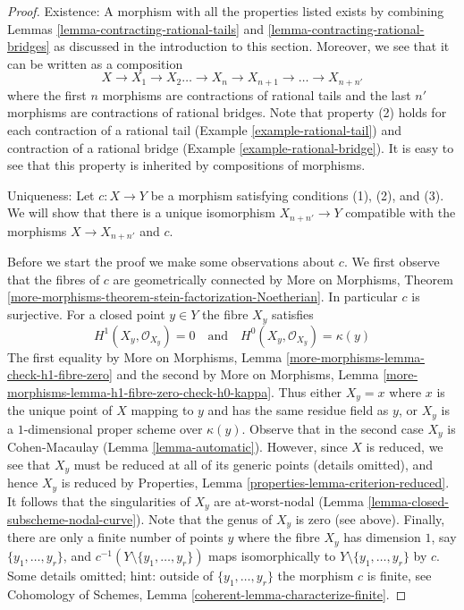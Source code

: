 \documentclass[10pt,a4paper]{amsart}
\theoremstyle{plain}
\theoremstyle{definition}
\theoremstyle{remark}
\numberwithin{equation}{subsection}
\begin{document}
\begin{proof}
Existence: A morphism with all the properties listed exists by
combining Lemmas \ref{lemma-contracting-rational-tails} and
\ref{lemma-contracting-rational-bridges} as discussed in the
introduction to this section.
Moreover, we see that it can be written as a composition
$$
X \to X_1 \to X_2 \ldots \to X_n \to X_{n + 1} \to \ldots \to X_{n + n'}
$$
where the first $n$ morphisms are contractions of rational tails
and the last $n'$ morphisms are contractions of rational bridges.
Note that property (2) holds for each contraction of a rational
tail (Example \ref{example-rational-tail}) and contraction of a
rational bridge (Example \ref{example-rational-bridge}).
It is easy to see that this property is inherited by compositions of morphisms.

\medskip\noindent
Uniqueness: Let $c : X \to Y$ be a morphism satisfying conditions
(1), (2), and (3). We will show that there is a unique isomorphism
$X_{n + n'} \to Y$ compatible with the morphisms $X \to X_{n + n'}$ and $c$.

\medskip\noindent
Before we start the proof we make some observations about $c$.
We first observe that the fibres of $c$ are geometrically connected by
More on Morphisms, Theorem
\ref{more-morphisms-theorem-stein-factorization-Noetherian}.
In particular $c$ is surjective.
For a closed point $y \in Y$ the fibre $X_y$ satisfies
$$
H^1(X_y, \mathcal{O}_{X_y}) = 0
\quad\text{and}\quad
H^0(X_y, \mathcal{O}_{X_y}) = \kappa(y)
$$
The first equality by More on Morphisms, Lemma
\ref{more-morphisms-lemma-check-h1-fibre-zero}
and the second by More on Morphisms, Lemma
\ref{more-morphisms-lemma-h1-fibre-zero-check-h0-kappa}.
Thus either $X_y = x$ where $x$ is the unique point of $X$ mapping to
$y$ and has the same residue field as $y$, or $X_y$ is a $1$-dimensional
proper scheme over $\kappa(y)$. Observe that in the second case
$X_y$ is Cohen-Macaulay (Lemma \ref{lemma-automatic}).
However, since $X$ is reduced, we see that $X_y$ must be reduced
at all of its generic points (details omitted), and hence $X_y$
is reduced by Properties, Lemma \ref{properties-lemma-criterion-reduced}.
It follows that the singularities of $X_y$ are at-worst-nodal
(Lemma \ref{lemma-closed-subscheme-nodal-curve}).
Note that the genus of $X_y$ is zero (see above).
Finally, there are only a finite number of points $y$ where
the fibre $X_y$ has dimension $1$, say
$\{y_1, \ldots, y_r\}$, and $c^{-1}(Y \setminus \{y_1, \ldots, y_r\})$
maps isomorphically to $Y \setminus \{y_1, \ldots, y_r\}$ by $c$.
Some details omitted; hint: outside of $\{y_1, \ldots, y_r\}$
the morphism $c$ is finite, see
Cohomology of Schemes, Lemma \ref{coherent-lemma-characterize-finite}.


\end{proof}
\end{document}
